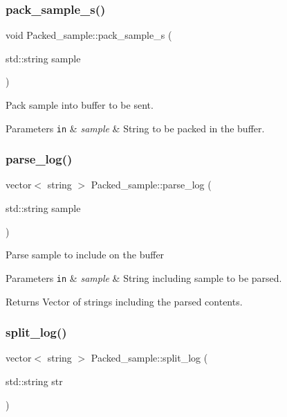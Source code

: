 \subsubsection{\texorpdfstring{pack\+\_\+sample\+\_\+s()}{pack\_sample\_s()}}
{\footnotesize\ttfamily void Packed\+\_\+sample\+::pack\+\_\+sample\+\_\+s (\begin{DoxyParamCaption}\item[{std\+::string}]{sample }\end{DoxyParamCaption})}

Pack sample into buffer to be sent.


\begin{DoxyParams}[1]{Parameters}
\mbox{\tt in}  & {\em sample} & String to be packed in the buffer. \\
\hline
\end{DoxyParams}
\mbox{\label{classPacked__sample_a66e88d8826169e056dc88b9654ce70f8}} 
\subsubsection{\texorpdfstring{parse\+\_\+log()}{parse\_log()}}
{\footnotesize\ttfamily vector$<$ string $>$ Packed\+\_\+sample\+::parse\+\_\+log (\begin{DoxyParamCaption}\item[{std\+::string}]{sample }\end{DoxyParamCaption})}

Parse sample to include on the buffer


\begin{DoxyParams}[1]{Parameters}
\mbox{\tt in}  & {\em sample} & String including sample to be parsed. \\
\hline
\end{DoxyParams}
\begin{DoxyReturn}{Returns}
Vector of strings including the parsed contents. 
\end{DoxyReturn}
\mbox{\label{classPacked__sample_a89c91c30951a092a804e1f371b226060}} 
\subsubsection{\texorpdfstring{split\+\_\+log()}{split\_log()}}
{\footnotesize\ttfamily vector$<$ string $>$ Packed\+\_\+sample\+::split\+\_\+log (\begin{DoxyParamCaption}\item[{std\+::string}]{str }\end{DoxyParamCaption})}

